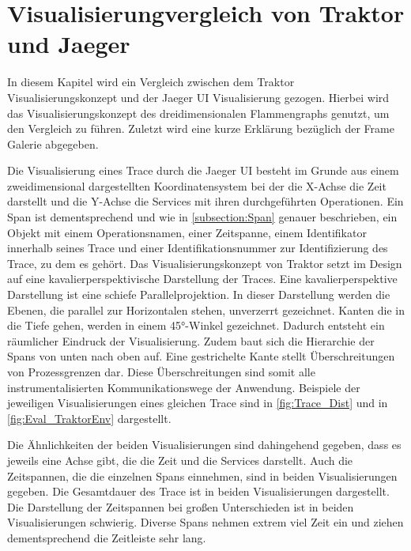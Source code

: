 \section{Visualisierungvergleich von Traktor und Jaeger}
\label{section:Visualisierungvergleich von Traktor und Jaeger}

In diesem Kapitel wird ein Vergleich zwischen dem Traktor Visualisierungskonzept und der Jaeger UI Visualisierung gezogen. Hierbei wird das Visualisierungskonzept des dreidimensionalen Flammengraphs genutzt, um den Vergleich zu führen. Zuletzt wird eine kurze Erklärung bezüglich der Frame Galerie abgegeben.

 Die Visualisierung eines Trace durch die Jaeger UI besteht im Grunde aus einem zweidimensional dargestellten Koordinatensystem bei der die X-Achse die Zeit darstellt und die Y-Achse die Services mit ihren durchgeführten Operationen. Ein Span ist dementsprechend und wie in \cref{subsection:Span} genauer beschrieben, ein Objekt mit einem Operationsnamen, einer Zeitspanne, einem Identifikator innerhalb seines Trace und einer Identifikationsnummer zur Identifizierung des Trace, zu dem es gehört. Das Visualisierungskonzept von Traktor setzt im Design auf eine kavalierperspektivische Darstellung der Traces. Eine kavalierperspektive Darstellung ist eine schiefe Parallelprojektion. In dieser Darstellung werden die Ebenen, die parallel zur Horizontalen stehen, unverzerrt gezeichnet. Kanten die in die Tiefe gehen, werden in einem \ang{45}-Winkel gezeichnet. Dadurch entsteht ein räumlicher Eindruck der Visualisierung. Zudem baut sich die Hierarchie der Spans von unten nach oben auf. Eine gestrichelte Kante stellt Überschreitungen von Prozessgrenzen dar. Diese Überschreitungen sind somit alle instrumentalisierten Kommunikationswege der Anwendung. Beispiele der jeweiligen Visualisierungen eines gleichen Trace sind in \cref{fig:Trace_Dist} und in \cref{fig:Eval_TraktorEnv} dargestellt. 

Die Ähnlichkeiten der beiden Visualisierungen sind dahingehend gegeben, dass es jeweils eine Achse gibt, die die Zeit und die Services darstellt. Auch die Zeitspannen, die die einzelnen Spans einnehmen, sind in beiden Visualisierungen gegeben. Die Gesamtdauer des Trace ist in beiden Visualisierungen dargestellt. Die Darstellung der Zeitspannen bei großen Unterschieden ist in beiden Visualisierungen schwierig. Diverse Spans nehmen extrem viel Zeit ein und ziehen dementsprechend die Zeitleiste sehr lang.

